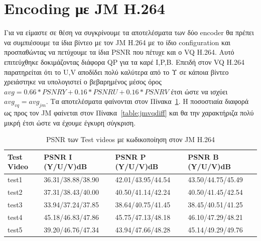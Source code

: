 \newpage
\section{Encoding με JM H.264}
\label{section:sect62}

\indent Για να είμαστε σε θέση να συγκρίνουμε τα αποτελέσματα των δύο encoder θα πρέπει να συμπιέσουμε τα ίδια βίντεο με τον JM H.264 με το ίδιο configuration και προσπαθώντας να πετύχουμε τα ίδια PSNR που πέτυχε και ο VQ H.264. Αυτό επιτεύχθηκε δοκιμάζοντας διάφορα QP για τα καρέ I,P,B. Επειδή στον VQ H.264 παρατηρείται ότι το U,V αποδίδει πολύ καλύτερα από το Υ σε κάποια βίντεο χρειάστηκε να υπολογιστεί ο βεβαρημένος μέσος όρος $avg = 0.66*PSNRY+0.16*PSNRU+0.16*PSNRV$ έτσι ώστε να ισχύει $avg_{vq}=avg_{jm}$. Τα αποτελέσματα φαίνονται στον Πίνακα~\ref{table:jm264}.
Η ποσοστιαία διαφορά ως προς τον JM φαίνεται στον Πίνακα~\ref{table:jmvqdiff} και θα την χαρακτήριζα πολύ μικρή έτσι ώστε να έχουμε έγκυρη σύγκριση.

\begin{table}[h!]
    \begin{center}
        \begin{tabular}{| l | l | l | l |}
        \hline
        Test Video & PSNR I (Y/U/V)dB  & PSNR P (Y/U/V)dB  & PSNR B (Y/U/V)dB       \\ \hline
        test1      & 36.31/38.88/38.90 & 42.01/43.95/44.54 & 43.50/44.75/45.49      \\ \hline
        test2      & 37.31/38.43/40.00 & 40.50/41.14/42.24 & 40.50/41.45/42.54      \\ \hline
        test3      & 33.94/37.24/37.85 & 38.64/40.75/41.45 & 38.45/40.51/41.25      \\ \hline
        test4      & 45.18/46.83/47.86 & 45.75/47.13/48.18 & 46.10/47.29/48.21      \\ \hline
        test5      & 39.20/46.76/47.34 & 43.94/47.66/48.28 & 45.14/49.29/49.76      \\ \hline
        \hline
        \end{tabular}
    \end{center}

    \caption{PSNR των Test videos με κωδικοποίηση στον JM H.264}
    \label{table:jm264}
\end{table}


